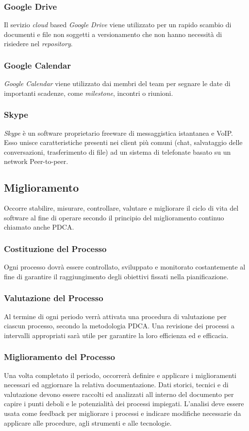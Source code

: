 \subsubsection{Google Drive}
Il sevizio \emph{cloud} based \emph{Google Drive} viene utilizzato
per un rapido scambio di documenti e file non soggetti a versionamento
che non hanno necessità di risiedere nel \emph{repository}.

\subsubsection{Google Calendar}
\emph{Google Calendar} viene utilizzato dai membri del team per
segnare le date di importanti scadenze, come \emph{milestone},
incontri o riunioni. 

\subsubsection{Skype}
\emph{Skype} è un software proprietario freeware di messaggistica
istantanea e VoIP. Esso unisce caratteristiche presenti nei client più
comuni (chat, salvataggio delle conversazioni, trasferimento di file)
ad un sistema di telefonate basato su un network Peer-to-peer. 

\subsection{Miglioramento} Occorre stabilire, misurare, controllare, valutare e migliorare il ciclo di vita del software al fine di operare secondo il principio del miglioramento continuo chiamato anche PDCA.

\subsubsection{Costituzione del Processo} Ogni processo dovrà essere controllato, sviluppato e monitorato costantemente al fine di garantire il raggiungimento degli obiettivi fissati nella pianificazione.
\subsubsection{Valutazione del Processo}
Al termine di ogni periodo verrà attivata una procedura di valutazione per ciascun processo, secondo la metodologia PDCA. Una revisione dei processi a intervalli appropriati sarà utile per garantire la loro efficienza ed e efficacia.
\subsubsection{Miglioramento del Processo}
Una volta completato il periodo, occorrerà definire e applicare i miglioramenti necessari ed aggiornare la relativa documentazione.
Dati storici, tecnici e di valutazione devono essere raccolti ed analizzati all interno del documento \pianodiqualifica per capire i punti deboli e le potenzialità dei processi impiegati. L’analisi deve essere usata come feedback per migliorare i processi e indicare modifiche necessarie da applicare alle procedure, agli strumenti e alle tecnologie.


